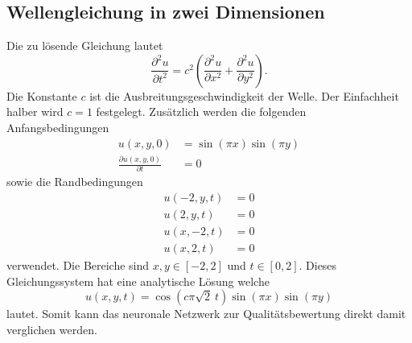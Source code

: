 \subsection{Wellengleichung in zwei Dimensionen}\label{neuronal:subsection:wellengleichung}
Die zu lösende Gleichung lautet
\begin{equation}
    \frac{\partial^2 u}{\partial t^2} = c^2 \left( \frac{\partial^2 u}{\partial x^2} + \frac{\partial^2 u}{\partial y^2} \right).
    \label{neuronal:wellengleichung}
\end{equation}
Die Konstante \( c \) ist die Ausbreitungsgeschwindigkeit der Welle. Der Einfachheit halber wird \( c = 1 \) festgelegt.
Zusätzlich werden die folgenden Anfangsbedingungen
\begin{equation}
    \begin{aligned}
        u(x, y, 0) &= \sin(\pi x) \sin(\pi y)\\
        \frac{\partial u(x, y, 0)}{\partial t} &= 0
    \end{aligned}
    \label{neuronal:wellen_anfangs}
\end{equation}
sowie die Randbedingungen
\begin{equation}
    \begin{aligned}
        u(-2, y, t) &= 0\\
        u(2, y, t) &= 0\\
        u(x, -2, t) &= 0\\
        u(x, 2, t) &= 0
    \end{aligned}
    \label{neuronal:wellen_rand}
\end{equation}
verwendet.
Die Bereiche sind \( x, y \in [-2,2] \) und \( t \in [0,2] \).
Dieses Gleichungssystem hat eine analytische Lösung welche
\begin{equation}
    u(x, y, t) = \cos(c \pi \sqrt{2}\: t)\sin(\pi x)\sin(\pi y)
    \label{neuronal:wellen_analytisch}
\end{equation}
lautet.
Somit kann das neuronale Netzwerk zur Qualitätsbewertung direkt damit verglichen werden.

